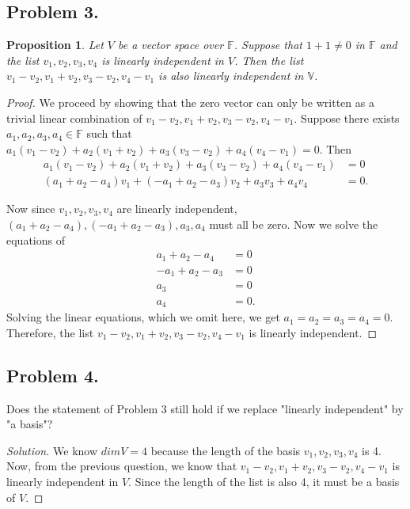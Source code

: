 \documentclass{article}
\newtheorem{proposition}[thm]{Proposition}
\begin{document}
\subsection*{Problem 3.}
\begin{proposition}
    Let $V$ be a vector space over $\mathbb{F}$. Suppose that $1+1\neq 0$ in $\mathbb{F}$ and the 
    list $v_1,v_2,v_3,v_4$ is linearly independent in $V$. Then the list $v_1-v_2,v_1+v_2,v_3-v_2
    ,v_4-v_1$ is also linearly independent in $\mathbb{V}$.
\end{proposition}
\begin{proof}
    We proceed by showing that the zero vector can only be written as a trivial linear 
    combination of $v_1-v_2,v_1+v_2,v_3-v_2,v_4-v_1$. Suppose there exists $a_1, a_2, a_3, a_4\in 
    \mathbb{F}$ such that $a_1(v_1-v_2) + a_2(v_1+v_2) + a_3(v_3-v_2) + a_4(v_4-v_1) = 0$. Then
    \begin{align*}
        a_1(v_1-v_2) + a_2(v_1+v_2) + a_3(v_3-v_2) + a_4(v_4-v_1) &= 0\\
        (a_1+a_2-a_4)v_1 + (-a_1+a_2-a_3)v_2 + a_3v_3 + a_4v_4 &= 0.
    \end{align*}    
    
    Now since $v_1, v_2, v_3, v_4$ are linearly independent, $(a_1+a_2-a_4), (-a_1+a_2-a_3), a_3, 
    a_4$ must all be zero. Now we solve the equations of 
    \begin{align*}
        a_1+a_2-a_4 &= 0\\
        -a_1+a_2-a_3 &= 0\\
        a_3 &= 0\\
        a_4 &= 0.
    \end{align*}
    Solving the linear equations, which we omit here, we get $a_1 = a_2 = a_3 = a_4 = 0$. 
    Therefore, the list $v_1-v_2, v_1+v_2, v_3-v_2, v_4-v_1$ is linearly independent.
\end{proof}

\subsection*{Problem 4.}
Does the statement of Problem 3 still hold if we replace "linearly independent" by "a basis"?
\begin{proof}[Solution]
    We know $dimV = 4$ because the length of the basis $v_1, v_2, v_3, v_4$ is 4. Now, from 
    the previous question, we know that $v_1-v_2, v_1+v_2, v_3-v_2, v_4-v_1$ is linearly 
    independent in $V$. Since the length of the list is also 4, it must be a basis of $V$.
\end{proof}
\end{document}
